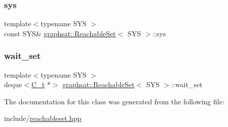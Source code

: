 \mbox{\label{classgraphsat_1_1_reachable_set_a8cd0c0375afff6bd2413505b49728ee4}} 
\subsubsection{\texorpdfstring{sys}{sys}}
{\footnotesize\ttfamily template$<$typename S\+YS $>$ \\
const S\+YS\& \mbox{\hyperlink{classgraphsat_1_1_reachable_set}{graphsat\+::\+Reachable\+Set}}$<$ S\+YS $>$\+::sys\hspace{0.3cm}{\ttfamily [private]}}

\mbox{\label{classgraphsat_1_1_reachable_set_a54d45bcedcff957c97638a40b60277ea}} 
\subsubsection{\texorpdfstring{wait\_set}{wait\_set}}
{\footnotesize\ttfamily template$<$typename S\+YS $>$ \\
deque$<$\mbox{\hyperlink{classgraphsat_1_1_reachable_set_a0b7981a216ec4c46be913e08d5f0cd07}{C\+\_\+t}} $\ast$$>$ \mbox{\hyperlink{classgraphsat_1_1_reachable_set}{graphsat\+::\+Reachable\+Set}}$<$ S\+YS $>$\+::wait\+\_\+set\hspace{0.3cm}{\ttfamily [private]}}



The documentation for this class was generated from the following file\+:\begin{DoxyCompactItemize}
\item 
include/\mbox{\hyperlink{reachableset_8hpp}{reachableset.\+hpp}}\end{DoxyCompactItemize}
